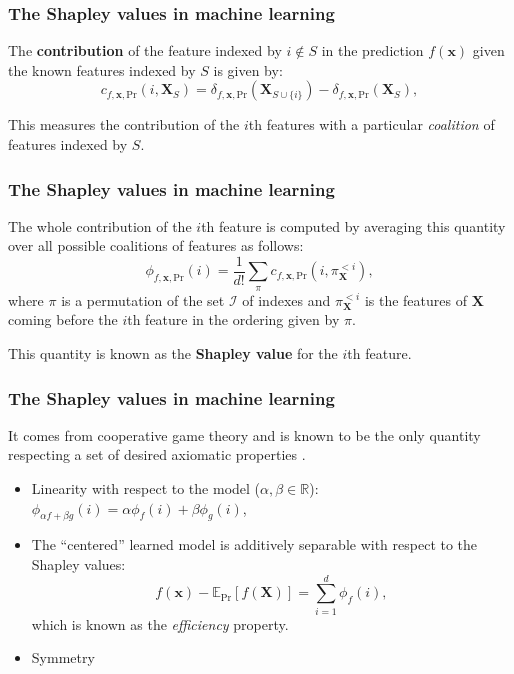 \documentclass{beamer}
\begin{document}
\begin{frame}
\frametitle{The Shapley values in machine learning}
  
The \textbf{contribution} of the feature indexed by $i \notin S$ in the prediction $f(\bm{x})$ given the known features indexed by $S$ is given by:
\begin{equation}
  \label{eq:contrib}
  c_{f,\bm{x},\text{Pr}}(i,\bm{X}_S) = \delta_{f,\bm{x},\text{Pr}}(\bm{X}_{S\cup\{i\}}) - \delta_{f,\bm{x},\text{Pr}}(\bm{X}_S),
\end{equation}

This measures the contribution of the $i$th features with a particular \emph{coalition} of features indexed by $S$.
\end{frame}

\begin{frame}
  \frametitle{The Shapley values in machine learning}
  
 The whole contribution of the $i$th feature is computed by averaging this quantity over all possible coalitions of features as follows:
\begin{equation}
  \phi_{f,\bm{x},\text{Pr}}(i) = \frac{1}{d!} \sum_{\pi}c_{f,\bm{x},\text{Pr}}(i,\pi^{<i}_{\bm{X}}),
\end{equation}
where $\pi$ is a permutation of the set $\mathcal{I}$ of indexes and $\pi^{<i}_{\bm{X}}$ is the features of $\bm{X}$ coming before the $i$th feature in the ordering given by $\pi$.
\pause
\begin{center}
  This quantity is known as the {\Large\textbf{Shapley value}} for the $i$th feature.
\end{center}

\end{frame}

\begin{frame}
  \frametitle{The Shapley values in machine learning}
  
  It comes from cooperative game theory and is known to be the only quantity respecting a set of desired axiomatic properties .
  \begin{itemize}
    \pause
\item Linearity with respect to the model ($\alpha, \beta \in \mathbb{R}$): $\phi_{\alpha f +\beta g}(i) = \alpha \phi_f(i) + \beta \phi_g(i)$,
    \pause
\item The ``centered'' learned model is additively separable with respect to the Shapley values:
\begin{equation}
  f(\bm{x})-\mathbb{E}_{\text{Pr}}[f(\bm{X})] = \sum_{i=1}^{d} \phi_f(i),
\end{equation}
which is known as the \emph{efficiency} property.
    \pause
\item Symmetry
\end{itemize}

\end{frame}
\end{document}
